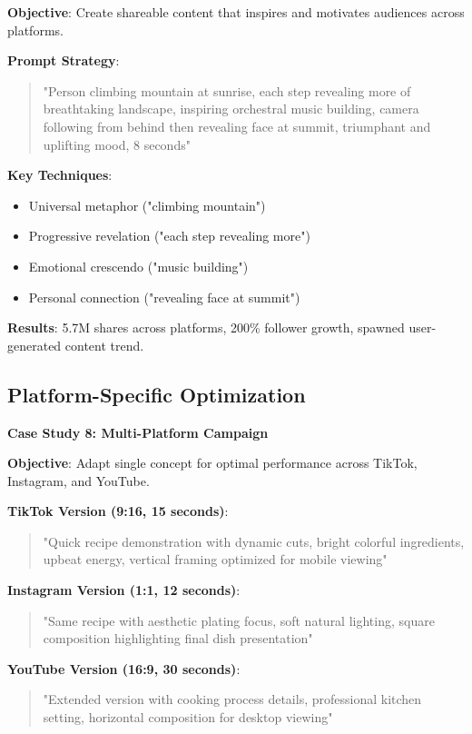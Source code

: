 \textbf{Objective}: Create shareable content that inspires and motivates audiences across platforms.

\textbf{Prompt Strategy}:
\begin{quote}
"Person climbing mountain at sunrise, each step revealing more of breathtaking landscape, inspiring orchestral music building, camera following from behind then revealing face at summit, triumphant and uplifting mood, 8 seconds"
\end{quote}

\textbf{Key Techniques}:
\begin{itemize}
\item Universal metaphor ("climbing mountain")
\item Progressive revelation ("each step revealing more")
\item Emotional crescendo ("music building")
\item Personal connection ("revealing face at summit")
\end{itemize}

\textbf{Results}: 5.7M shares across platforms, 200\% follower growth, spawned user-generated content trend.

\subsection{Platform-Specific Optimization}
\textbf{Case Study 8: Multi-Platform Campaign}

\textbf{Objective}: Adapt single concept for optimal performance across TikTok, Instagram, and YouTube.

\textbf{TikTok Version (9:16, 15 seconds)}:
\begin{quote}
"Quick recipe demonstration with dynamic cuts, bright colorful ingredients, upbeat energy, vertical framing optimized for mobile viewing"
\end{quote}

\textbf{Instagram Version (1:1, 12 seconds)}:
\begin{quote}
"Same recipe with aesthetic plating focus, soft natural lighting, square composition highlighting final dish presentation"
\end{quote}

\textbf{YouTube Version (16:9, 30 seconds)}:
\begin{quote}
"Extended version with cooking process details, professional kitchen setting, horizontal composition for desktop viewing"
\end{quote}

